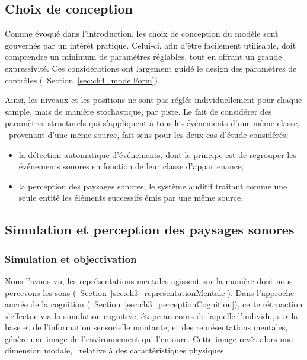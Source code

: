 \subsection{Choix de conception}

Comme évoqué dans l'introduction, les choix de conception du modèle sont gouvernés par un intérêt pratique. Celui-ci, afin d'être facilement utilisable, doit comprendre un minimum de paramètres réglables, tout en offrant un grande expressivité. Ces considérations ont largement guidé le design des paramètres de contrôles (\cf~Section~\ref{sec:ch4_modelForm}).

Ainsi, les niveaux et les positions ne sont pas réglés individuellement pour chaque sample, mais de manière stochastique, par piste. Le fait de considérer des paramètres structurels qui s'appliquent à tous les événements d'une même classe, \ie~provenant d'une même source, fait sens pour les deux cas d'étude considérés:

\begin{itemize}
\item la détection automatique d'événements, dont le principe est de regrouper les événements sonores en fonction de leur classe d'appartenance;
\item la perception des paysages sonores, le système auditif traitant comme une seule entité les éléments successifs émis par une même source.
\end{itemize}

\subsection{Simulation et perception des paysages sonores}

\subsubsection{Simulation et objectivation}

Nous l'avons vu, les représentations mentales agissent sur la manière dont nous percevons les sons (\cf~Section~\ref{sec:ch3_representationMentale}). Dans l'approche ancrée de la cognition (\cf~Section~\ref{sec:ch3_perceptionCognition}), cette rétroaction s'effectue via la simulation cognitive, étape au cours de laquelle l'individu, sur la base et de l'information sensorielle montante, et des représentations mentales, génère une image de l'environnement qui l'entoure. Cette image revêt alors une dimension modale, \ie~relative à des caractéristiques physiques.

